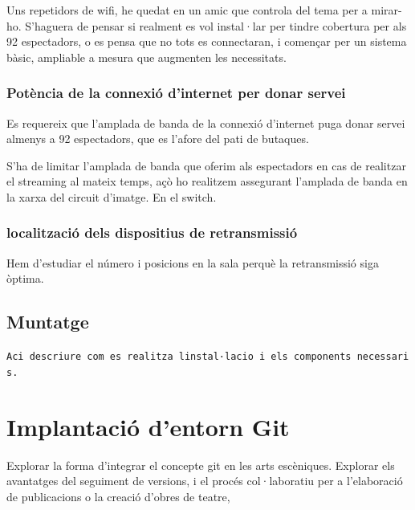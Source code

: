 \documentclass[
  10pt,
]{krantz}
\begin{document}
Uns repetidors de wifi, he quedat en un amic que controla del tema per a mirar-ho. S'haguera de pensar si realment es vol instal·lar per tindre cobertura per als 92 espectadors, o es pensa que no tots es connectaran, i començar per un sistema bàsic, ampliable a mesura que augmenten les necessitats.

\hypertarget{potuxe8ncia-de-la-connexiuxf3-dinternet-per-donar-servei}{%
\subsection{Potència de la connexió d'internet per donar servei}\label{potuxe8ncia-de-la-connexiuxf3-dinternet-per-donar-servei}}

Es requereix que l'amplada de banda de la connexió d'internet puga donar servei almenys a 92 espectadors, que es l'afore del pati de butaques.

S'ha de limitar l'amplada de banda que oferim als espectadors en cas de realitzar el streaming al mateix temps, açò ho realitzem assegurant l'amplada de banda en la xarxa del circuit d'imatge. En el switch.

\hypertarget{localitzaciuxf3-dels-dispositius-de-retransmissiuxf3}{%
\subsection{localització dels dispositius de retransmissió}\label{localitzaciuxf3-dels-dispositius-de-retransmissiuxf3}}

Hem d'estudiar el número i posicions en la sala perquè la retransmissió siga òptima.

\hypertarget{muntatge-1}{%
\section{Muntatge}\label{muntatge-1}}

\texttt{Aci\ descriure\ com\ es\ realitza\ l\textquotesingle{}instal·lacio\ i\ els\ components\ necessaris.}

\hypertarget{implantaciuxf3-dentorn-git}{%
\chapter{Implantació d'entorn Git}\label{implantaciuxf3-dentorn-git}}

Explorar la forma d'integrar el concepte git en les arts escèniques. Explorar els avantatges del seguiment de versions, i el procés col·laboratiu per a l'elaboració de publicacions o la creació d'obres de teatre,
\end{document}
